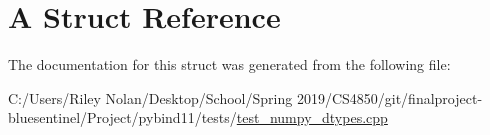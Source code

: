 \hypertarget{struct_a}{}\section{A Struct Reference}
\label{struct_a}


The documentation for this struct was generated from the following file\+:\begin{DoxyCompactItemize}
\item 
C\+:/\+Users/\+Riley Nolan/\+Desktop/\+School/\+Spring 2019/\+C\+S4850/git/finalproject-\/bluesentinel/\+Project/pybind11/tests/\mbox{\hyperlink{test__numpy__dtypes_8cpp}{test\+\_\+numpy\+\_\+dtypes.\+cpp}}\end{DoxyCompactItemize}
